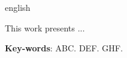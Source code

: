 \begin{resumo}[Abstract]
 \begin{otherlanguage*}{english}
 
 This work presents ...
 
   \vspace{\onelineskip}
 
   \noindent 
   \textbf{Key-words}: ABC. DEF. GHF.
 \end{otherlanguage*}
\end{resumo}
\newpage